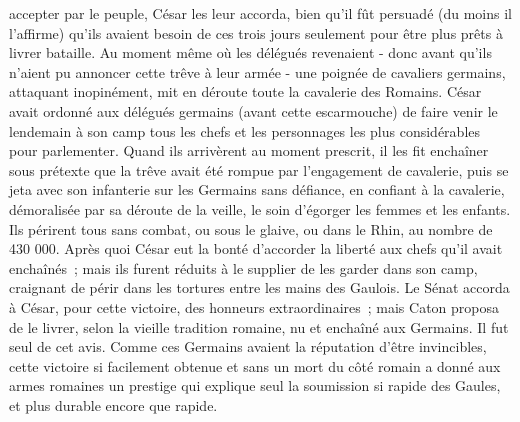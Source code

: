 \documentclass[french,twoside]{book} %
\begin{document}
accepter par le peuple, César les leur accor­da, bien qu'il fût persuadé (du moins il l'affirme) qu'ils avaient besoin de ces trois jours seulement pour être plus prêts à livrer bataille. Au moment même où les délégués revenaient - donc avant qu'ils n'aient pu annoncer cette trêve à leur armée - une poignée de cavaliers germains, attaquant inopinément, mit en déroute toute la cavalerie des Romains. César avait ordonné aux délégués germains (avant cette escarmouche) de faire venir le lendemain à son camp tous les chefs et les personnages les plus considérables pour parlementer. Quand ils arrivèrent au moment prescrit, il les fit enchaîner sous prétexte que la trêve avait été rompue par l'engagement de cavalerie, puis se jeta avec son infanterie sur les Germains sans défiance, en confiant à la cavalerie, démora­lisée par sa déroute de la veille, le soin d'égorger les femmes et les enfants. Ils périrent tous sans combat, ou sous le glaive, ou dans le Rhin, au nombre de 430 000. Après quoi César eut la bonté d'accorder la liberté aux chefs qu'il avait enchaînés ; mais ils furent réduits à le supplier de les garder dans son camp, craignant de périr dans les tortures entre les mains des Gaulois. Le Sénat accorda à César, pour cette victoire, des honneurs extraordinaires ; mais Caton proposa de le livrer, selon la vieille tradition romaine, nu et enchaîné aux Germains. Il fut seul de cet avis. Comme ces Germains avaient la réputa­tion d'être invincibles, cette victoire si facilement obtenue et sans un mort du côté romain a donné aux armes romaines un prestige qui explique seul la soumission si rapide des Gaules, et plus durable encore que rapide.\par
\end{document}
